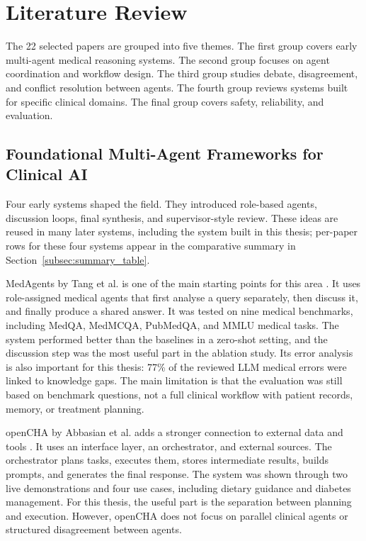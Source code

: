 \FloatBarrier
\section{Literature Review}
\label{sec:litreview}

The 22 selected papers are grouped into five themes. The first group covers early
multi-agent medical reasoning systems. The second group focuses on agent
coordination and workflow design. The third group studies debate, disagreement,
and conflict resolution between agents. The fourth group reviews systems built
for specific clinical domains. The final group covers safety, reliability, and
evaluation.

\FloatBarrier
\subsection{Foundational Multi-Agent Frameworks for Clinical AI}
\label{subsec:foundational}

Four early systems shaped the field. They introduced role-based
agents, discussion loops, final synthesis, and supervisor-style
review. These ideas are reused in many later systems, including the
system built in this thesis; per-paper rows for these four systems
appear in the comparative summary in
Section~\ref{subsec:summary_table}.

MedAgents by Tang et al. is one of the main starting points for this area
\cite{Tang2024MedAgents}. It uses role-assigned medical agents that first analyse
a query separately, then discuss it, and finally produce a shared answer. It was
tested on nine medical benchmarks, including MedQA, MedMCQA, PubMedQA, and MMLU
medical tasks. The system performed better than the baselines in a zero-shot
setting, and the discussion step was the most useful part in the ablation study.
Its error analysis is also important for this thesis: 77\% of the reviewed LLM
medical errors were linked to knowledge gaps. The main limitation is that the
evaluation was still based on benchmark questions, not a full clinical workflow
with patient records, memory, or treatment planning.

openCHA by Abbasian et al. adds a stronger connection to external data and tools
\cite{Abbasian2024openCHA}. It uses an interface layer, an orchestrator, and
external sources. The orchestrator plans tasks, executes them, stores
intermediate results, builds prompts, and generates the final response. The
system was shown through two live demonstrations and four use cases, including
dietary guidance and diabetes management. For this thesis, the useful part is
the separation between planning and execution. However, openCHA does not focus on
parallel clinical agents or structured disagreement between agents.

